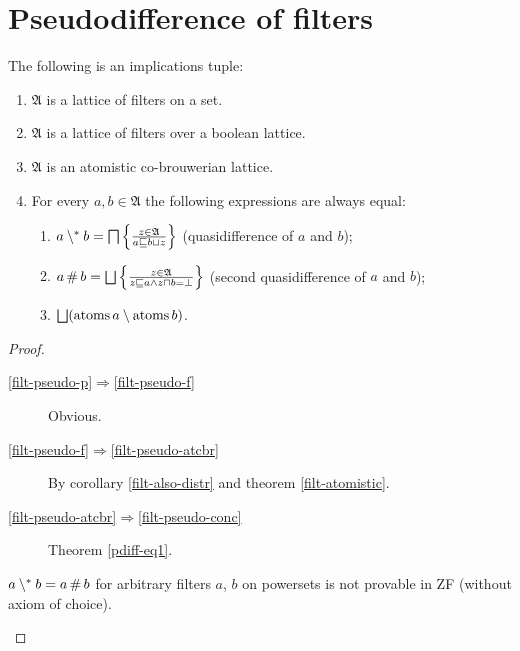 \section{Pseudodifference of filters}
\begin{prop}
\label{filt-pseudo}The following is an implications tuple:
\begin{enumerate}
\item \label{filt-pseudo-p}$\mathfrak{A}$ is a lattice of filters on a
set.
\item \label{filt-pseudo-f}$\mathfrak{A}$ is a lattice of filters over
a boolean lattice.
\item \label{filt-pseudo-atcbr}$\mathfrak{A}$ is an atomistic co-brouwerian
lattice.
\item \label{filt-pseudo-conc}For every $a,b\in\mathfrak{A}$ the following
expressions are always equal:

\begin{enumerate}
\item $a\setminus^{\ast} b=\bigsqcap\left\{ \frac{z\in\mathfrak{A}}{a\sqsubseteq b\sqcup z}\right\}$
(quasidifference of $a$ and $b$);
\item $a\mathop\#b=\bigsqcup\setcond{z\in\mathfrak{A}}{z\sqsubseteq a\land z\sqcap b=\bot}$
(second quasidifference of $a$ and $b$);
\item $\bigsqcup(\atoms a\setminus\atoms b)$.
\end{enumerate}
\end{enumerate}
\end{prop}
\begin{proof}
~
\begin{description}
\item [{\ref{filt-pseudo-p}$\Rightarrow$\ref{filt-pseudo-f}}] Obvious.
\item [{\ref{filt-pseudo-f}$\Rightarrow$\ref{filt-pseudo-atcbr}}] By
corollary \ref{filt-also-distr} and theorem \ref{filt-atomistic}.
\item [{\ref{filt-pseudo-atcbr}$\Rightarrow$\ref{filt-pseudo-conc}}] Theorem
\ref{pdiff-eq1}.\end{description}
\begin{conjecture}
$a\setminus^{\ast} b=a\mathop\#b$ for arbitrary filters $a$, $b$ on powersets
is not provable in ZF (without axiom of choice).
\end{conjecture}
\end{proof}

